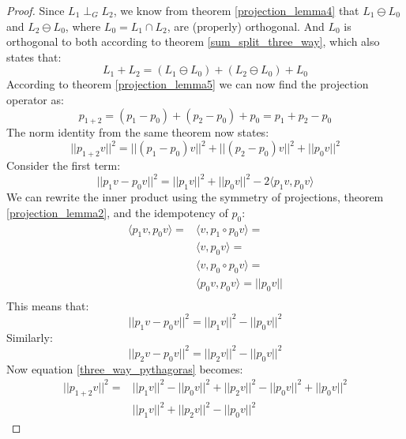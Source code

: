 \documentclass[12pt, a4paper]{article}
\numberwithin{equation}{section}
\begin{document}
\begin{proof}
Since $L_1\perp_G L_2$, we know from theorem \ref{projection_lemma4} that $L_1\ominus L_0$ and $L_2\ominus L_0$, where $L_0=L_1\cap L_2$, are (properly) orthogonal. And $L_0$ is orthogonal to both according to theorem \ref{sum_split_three_way}, which also states that:
\begin{equation}
L_1+L_2=(L_1\ominus L_0)+(L_2\ominus L_0)+L_0
\end{equation}
According to theorem \ref{projection_lemma5} we can now find the projection operator as:
\begin{equation}
p_{1+2}=(p_1-p_0)+(p_2-p_0)+p_0=p_1+p_2-p_0
\end{equation}
The norm identity from the same theorem now states:
\begin{equation}
\label{three_way_pythagoras}
||p_{1+2}v||^2=||(p_1-p_0)v||^2+||(p_2-p_0)v||^2+||p_0 v||^2
\end{equation}
Consider the first term:
\begin{equation}
||p_1 v-p_0 v||^2=||p_1 v||^2+||p_0 v||^2-2\langle p_1 v, p_0 v\rangle
\end{equation}
We can rewrite the inner product using the symmetry of projections, theorem \ref{projection_lemma2}, and the idempotency of $p_0$:
\begin{align}
\langle p_1 v, p_0 v\rangle=&\langle v, p_1\circ p_0 v\rangle=\\
&\langle v, p_0 v\rangle=\\
&\langle v, p_0\circ p_0 v\rangle=\\
&\langle p_0 v, p_0 v\rangle=||p_0 v||\\
\end{align}
This means that:
\begin{equation}
||p_1 v-p_0 v||^2=||p_1 v||^2-||p_0 v||^2
\end{equation}
Similarly:
\begin{equation}
||p_2 v-p_0 v||^2=||p_2 v||^2-||p_0 v||^2
\end{equation}
Now equation \ref{three_way_pythagoras} becomes:
\begin{align}
||p_{1+2}v||^2=&||p_1 v||^2-||p_0 v||^2+||p_2 v||^2-||p_0 v||^2+||p_0 v||^2\\
&||p_1 v||^2+||p_2 v||^2-||p_0 v||^2
\end{align}

\end{proof}
\end{document}
